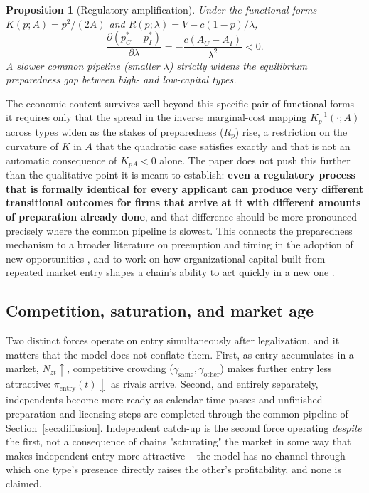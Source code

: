\documentclass[english,12pt]{article}
\newtheorem{proposition}{Proposition}
\begin{document}
\begin{proposition}[Regulatory amplification]
\label{prop:amplification}
Under the functional forms $K(p;A)=p^2/(2A)$ and $R(p;\lambda)=V-c(1-p)/\lambda$,
\[
\frac{\partial(p_C^*-p_I^*)}{\partial\lambda} = -\frac{c(A_C-A_I)}{\lambda^2} < 0.
\]
A slower common pipeline (smaller $\lambda$) strictly widens the equilibrium preparedness gap between high- and low-capital types.
\end{proposition}

The economic content survives well beyond this specific pair of functional forms -- it requires only that the spread in the inverse marginal-cost mapping $K_p^{-1}(\cdot;A)$ across types widen as the stakes of preparedness ($R_p$) rise, a restriction on the curvature of $K$ in $A$ that the quadratic case satisfies exactly and that is not an automatic consequence of $K_{pA}<0$ alone. The paper does not push this further than the qualitative point it is meant to establish: \textbf{even a regulatory process that is formally identical for every applicant can produce very different transitional outcomes for firms that arrive at it with different amounts of preparation already done}, and that difference should be more pronounced precisely where the common pipeline is slowest. This connects the preparedness mechanism to a broader literature on preemption and timing in the adoption of new opportunities \citep{FudenbergTirole1985,Dixit1989}, and to work on how organizational capital built from repeated market entry shapes a chain's ability to act quickly in a new one \citep{PrescottVisscher1980,Jia2008}.

\subsection{Competition, saturation, and market age}
\label{sec:saturation}

Two distinct forces operate on entry simultaneously after legalization, and it matters that the model does not conflate them. First, as entry accumulates in a market, $N_{zt}\uparrow$, competitive crowding ($\gamma_{\text{same}},\gamma_{\text{other}}$) makes further entry less attractive: $\pi_{\text{entry}}(t)\downarrow$ as rivals arrive. Second, and entirely separately, independents become more ready as calendar time passes and unfinished preparation and licensing steps are completed through the common pipeline of Section~\ref{sec:diffusion}. Independent catch-up is the second force operating \emph{despite} the first, not a consequence of chains "saturating" the market in some way that makes independent entry more attractive -- the model has no channel through which one type's presence directly raises the other's profitability, and none is claimed.
\end{document}
